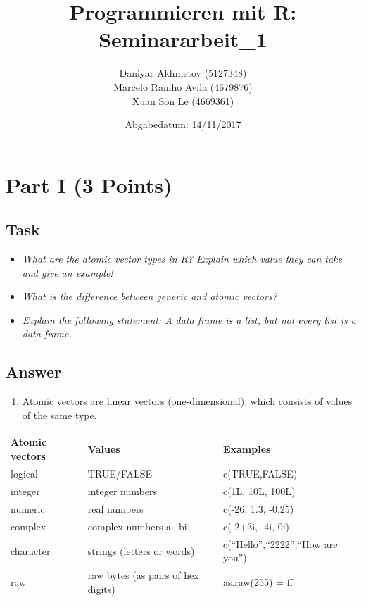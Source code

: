 \documentclass[12,]{article}
\title{Programmieren mit R: Seminararbeit\_1}
\author{Daniyar Akhmetov (5127348) \\ Marcelo Rainho Avila (4679876) \\ Xuan Son Le (4669361)}
\date{Abgabedatum: 14/11/2017}
\providecommand{\tightlist}{%
  \setlength{\itemsep}{0pt}\setlength{\parskip}{0pt}}
\begin{document}
\maketitle

{
\setcounter{tocdepth}{3}
\tableofcontents
}
\newpage

\section{Part I (3 Points)}\label{part-i-3-points}

\subsection{Task}\label{task}

\begin{itemize}
\tightlist
\item
  \emph{What are the atomic vector types in R? Explain which value they
  can take and give an example!}
\item
  \emph{What is the difference between generic and atomic vectors?}
\item
  \emph{Explain the following statement: A data frame is a list, but not
  every list is a data frame.}
\end{itemize}

\subsection{Answer}\label{answer}

\begin{enumerate}
\def\labelenumi{\arabic{enumi}.}
\tightlist
\item
  Atomic vectors are linear vectors (one-dimensional), which consists of
  values of the same type.
\end{enumerate}

\begin{longtable}[]{@{}lll@{}}
\toprule
\textbf{Atomic vectors} & \textbf{Values} &
\textbf{Examples}\tabularnewline
\midrule
\endhead
logical & TRUE/FALSE & c(TRUE,FALSE)\tabularnewline
integer & integer numbers & c(1L, 10L, 100L)\tabularnewline
numeric & real numbers & c(-26, 1.3, -0.25)\tabularnewline
complex & complex numbers a+bi & c(-2+3i, -4i, 0i)\tabularnewline
character & strings (letters or words) & c(``Hello'',``2222'',``How are
you'')\tabularnewline
raw & raw bytes (as pairs of hex digits) & as.raw(255) =
ff\tabularnewline
\bottomrule
\end{longtable}
\end{document}
